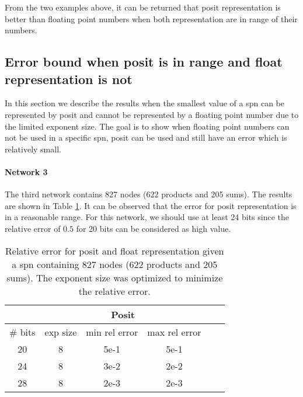 From the two examples above, it can be returned that posit representation is better than floating point numbers when both representation are in range of their numbers.



\subsection{Error bound when posit is in range and float representation is not}
In this section we describe the results when the smallest value of a \gls{spn} can be represented by posit and cannot be represented by a floating point number due to the limited exponent size. The goal is to show when floating point numbers can not be used in a specific \gls{spn}, posit can be used and still have an error which is relatively small.

\paragraph{Network 3}

The third network contains 827 nodes (622 products and 205 sums). The results are shown in Table \ref{tab:net3_res}. It can be observed that the error for posit representation is in a reasonable range. For this network, we should use at least 24 bits since the relative error of $0.5$ for 20 bits can be considered as high value.

\begin{table}[!ht]
	\centering
	\caption{Relative error for posit and float representation given a \gls{spn} containing 827 nodes (622 products and 205 sums). The exponent size was optimized to minimize the relative error.}
	\label{tab:net3_res}
	\begin{tabular}{|c||c|c|c||c|c|}
	\hline
		& \multicolumn{3}{c||}{Posit}\\
	\hline
		\# bits & exp size & min rel error & max rel error \\
	\hline
		20 & 8 & 5e-1 & 5e-1 \\
		24 & 8 & 3e-2 & 2e-2 \\
		28 & 8 & 2e-3 & 2e-3 \\
	\hline
	\end{tabular}
\end{table}


